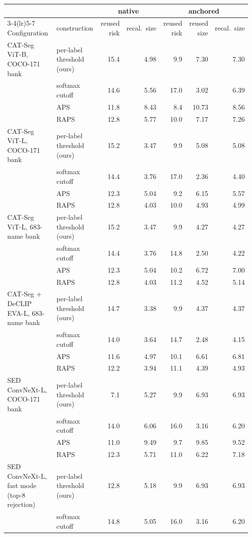 \begin{tabular}{@{}llrrrrr@{}}
\toprule
& & \multicolumn{2}{c}{native} & \multicolumn{3}{c}{anchored} \\
\cmidrule(lr){3-4}\cmidrule(lr){5-7}
Configuration & construction & reused risk & recal.\ size & reused risk & reused size & recal.\ size \\
\midrule
CAT-Seg ViT-B, COCO-171 bank & per-label threshold (ours) & 15.4 & 4.98 & 9.9 & 7.30 & 7.30 \\
 & softmax cutoff & 14.6 & 5.56 & 17.0 & 3.02 & 6.39 \\
 & APS & 11.8 & 8.43 & 8.4 & 10.73 & 8.56 \\
 & RAPS & 12.8 & 5.77 & 10.0 & 7.17 & 7.26 \\
\midrule
CAT-Seg ViT-L, COCO-171 bank & per-label threshold (ours) & 15.2 & 3.47 & 9.9 & 5.08 & 5.08 \\
 & softmax cutoff & 14.4 & 3.76 & 17.0 & 2.36 & 4.40 \\
 & APS & 12.3 & 5.04 & 9.2 & 6.15 & 5.57 \\
 & RAPS & 12.8 & 4.03 & 10.0 & 4.93 & 4.99 \\
\midrule
CAT-Seg ViT-L, 683-name bank & per-label threshold (ours) & 15.2 & 3.47 & 9.9 & 4.27 & 4.27 \\
 & softmax cutoff & 14.4 & 3.76 & 14.8 & 2.50 & 4.22 \\
 & APS & 12.3 & 5.04 & 10.2 & 6.72 & 7.00 \\
 & RAPS & 12.8 & 4.03 & 11.2 & 4.52 & 5.14 \\
\midrule
CAT-Seg + DeCLIP EVA-L, 683-name bank & per-label threshold (ours) & 14.7 & 3.38 & 9.9 & 4.37 & 4.37 \\
 & softmax cutoff & 14.0 & 3.64 & 14.7 & 2.48 & 4.15 \\
 & APS & 11.6 & 4.97 & 10.1 & 6.61 & 6.81 \\
 & RAPS & 12.2 & 3.94 & 11.1 & 4.39 & 4.93 \\
\midrule
SED ConvNeXt-L, COCO-171 bank & per-label threshold (ours) & 7.1 & 5.27 & 9.9 & 6.93 & 6.93 \\
 & softmax cutoff & 14.0 & 6.06 & 16.0 & 3.16 & 6.20 \\
 & APS & 11.0 & 9.49 & 9.7 & 9.85 & 9.52 \\
 & RAPS & 12.3 & 5.71 & 11.0 & 6.22 & 7.18 \\
\midrule
SED ConvNeXt-L, fast mode (top-8 rejection) & per-label threshold (ours) & 12.8 & 5.18 & 9.9 & 6.93 & 6.93 \\
 & softmax cutoff & 14.8 & 5.05 & 16.0 & 3.16 & 6.20 \\

\end{tabular}
